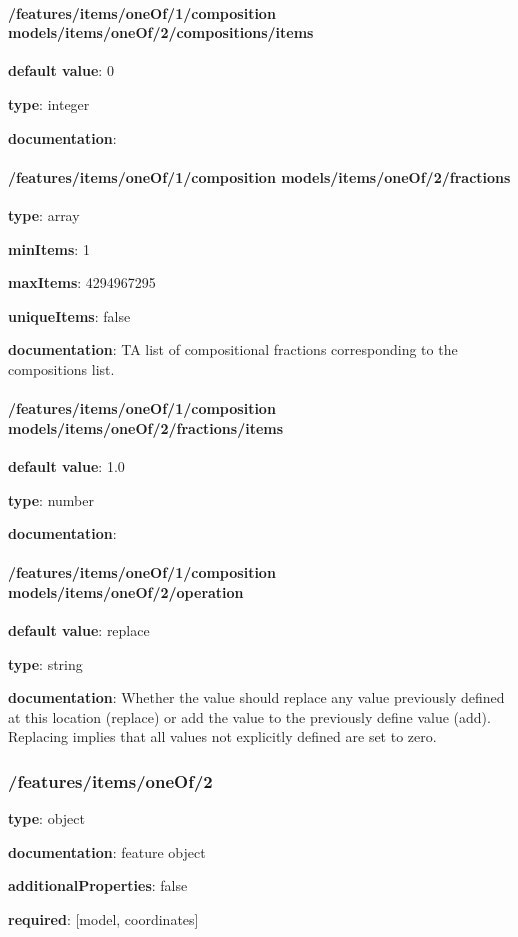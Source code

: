 \begin{itemized}
\paragraph{/features/items/oneOf/1/composition models/items/oneOf/2/compositions/items} \begin{itemized}
\item {\bf default value}: 0
\item {\bf type}: integer
\item {\bf documentation}: 
\end{itemized}\end{itemized}\paragraph{/features/items/oneOf/1/composition models/items/oneOf/2/fractions} \begin{itemized}
\item {\bf type}: array
\item {\bf minItems}: 1
\item {\bf maxItems}: 4294967295
\item {\bf uniqueItems}: false
\item {\bf documentation}: TA list of compositional fractions corresponding to the compositions list.
\paragraph{/features/items/oneOf/1/composition models/items/oneOf/2/fractions/items} \begin{itemized}
\item {\bf default value}: 1.0
\item {\bf type}: number
\item {\bf documentation}: 
\end{itemized}\end{itemized}\paragraph{/features/items/oneOf/1/composition models/items/oneOf/2/operation} \begin{itemized}
\item {\bf default value}: replace
\item {\bf type}: string
\item {\bf documentation}: Whether the value should replace any value previously defined at this location (replace) or add the value to the previously define value (add). Replacing implies that all values not explicitly defined are set to zero.
\end{itemized}\subsubsection{/features/items/oneOf/2} \begin{itemized}
\item {\bf type}: object
\item {\bf documentation}: feature object
\item {\bf additionalProperties}: false
\item {\bf required}: [model, coordinates]\end{itemized}
